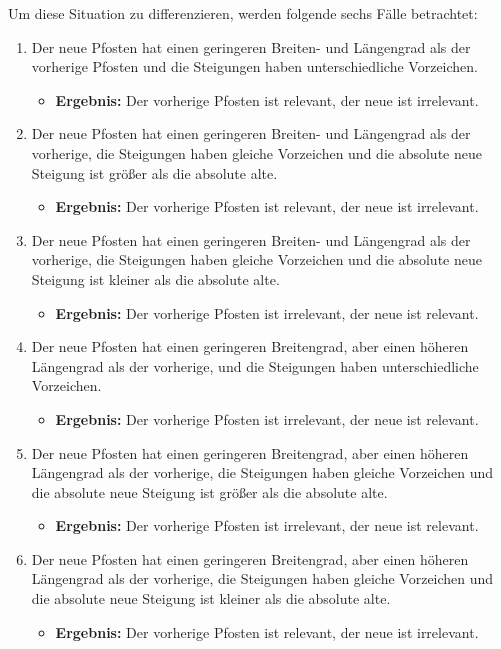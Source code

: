 Um diese Situation zu differenzieren, werden folgende sechs Fälle betrachtet:
\begin{enumerate}
	\item Der neue Pfosten hat einen geringeren Breiten- und Längengrad als der vorherige Pfosten und die Steigungen haben unterschiedliche Vorzeichen.
	\begin{itemize}
		\item \textbf{Ergebnis:} Der vorherige Pfosten ist relevant, der neue ist irrelevant.
	\end{itemize}
	\item Der neue Pfosten hat einen geringeren Breiten- und Längengrad als der vorherige, die Steigungen haben gleiche Vorzeichen und die absolute neue Steigung ist größer als die absolute alte.
	\begin{itemize}
		\item \textbf{Ergebnis:} Der vorherige Pfosten ist relevant, der neue ist irrelevant.
	\end{itemize}
	\item Der neue Pfosten hat einen geringeren Breiten- und Längengrad als der vorherige, die Steigungen haben gleiche Vorzeichen und die absolute neue Steigung ist kleiner als die absolute alte.
	\begin{itemize}
		\item \textbf{Ergebnis:} Der vorherige Pfosten ist irrelevant, der neue ist relevant.
	\end{itemize}
	\item Der neue Pfosten hat einen geringeren Breitengrad, aber einen höheren Längengrad als der vorherige, und die Steigungen haben unterschiedliche Vorzeichen.
	\begin{itemize}
		\item \textbf{Ergebnis:} Der vorherige Pfosten ist irrelevant, der neue ist relevant.
	\end{itemize}
	\item Der neue Pfosten hat einen geringeren Breitengrad, aber einen höheren Längengrad als der vorherige, die Steigungen haben gleiche Vorzeichen und die absolute neue Steigung ist größer als die absolute alte.
	\begin{itemize}
		\item \textbf{Ergebnis:} Der vorherige Pfosten ist irrelevant, der neue ist relevant.
	\end{itemize}
	\item Der neue Pfosten hat einen geringeren Breitengrad, aber einen höheren Längengrad als der vorherige, die Steigungen haben gleiche Vorzeichen und die absolute neue Steigung ist kleiner als die absolute alte.
	\begin{itemize}
		\item \textbf{Ergebnis:} Der vorherige Pfosten ist relevant, der neue ist irrelevant.
	\end{itemize}
\end{enumerate}

